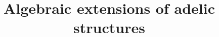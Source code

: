 \documentclass{article}
\title{Algebraic extensions of adelic structures}
\author{}
\date{}
\begin{document}
\maketitle

{\raggedright


}
\end{document}

